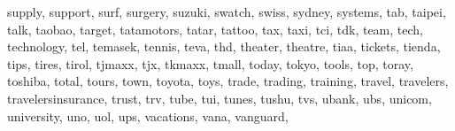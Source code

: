 \documentclass[letterpaper,10pt,english]{sphinxmanual}
\begin{document}
\begin{fulllineitems}
\begin{fulllineitems}
\textquotesingle{}supply\textquotesingle{}, \textquotesingle{}support\textquotesingle{}, \textquotesingle{}surf\textquotesingle{}, \textquotesingle{}surgery\textquotesingle{}, \textquotesingle{}suzuki\textquotesingle{}, \textquotesingle{}swatch\textquotesingle{}, \textquotesingle{}swiss\textquotesingle{}, \textquotesingle{}sydney\textquotesingle{}, \textquotesingle{}systems\textquotesingle{}, \textquotesingle{}tab\textquotesingle{}, \textquotesingle{}taipei\textquotesingle{}, \textquotesingle{}talk\textquotesingle{}, \textquotesingle{}taobao\textquotesingle{}, \textquotesingle{}target\textquotesingle{}, \textquotesingle{}tatamotors\textquotesingle{}, \textquotesingle{}tatar\textquotesingle{}, \textquotesingle{}tattoo\textquotesingle{}, \textquotesingle{}tax\textquotesingle{}, \textquotesingle{}taxi\textquotesingle{}, \textquotesingle{}tci\textquotesingle{}, \textquotesingle{}tdk\textquotesingle{}, \textquotesingle{}team\textquotesingle{}, \textquotesingle{}tech\textquotesingle{}, \textquotesingle{}technology\textquotesingle{}, \textquotesingle{}tel\textquotesingle{}, \textquotesingle{}temasek\textquotesingle{}, \textquotesingle{}tennis\textquotesingle{}, \textquotesingle{}teva\textquotesingle{}, \textquotesingle{}thd\textquotesingle{}, \textquotesingle{}theater\textquotesingle{}, \textquotesingle{}theatre\textquotesingle{}, \textquotesingle{}tiaa\textquotesingle{}, \textquotesingle{}tickets\textquotesingle{}, \textquotesingle{}tienda\textquotesingle{}, \textquotesingle{}tips\textquotesingle{}, \textquotesingle{}tires\textquotesingle{}, \textquotesingle{}tirol\textquotesingle{}, \textquotesingle{}tjmaxx\textquotesingle{}, \textquotesingle{}tjx\textquotesingle{}, \textquotesingle{}tkmaxx\textquotesingle{}, \textquotesingle{}tmall\textquotesingle{}, \textquotesingle{}today\textquotesingle{}, \textquotesingle{}tokyo\textquotesingle{}, \textquotesingle{}tools\textquotesingle{}, \textquotesingle{}top\textquotesingle{}, \textquotesingle{}toray\textquotesingle{}, \textquotesingle{}toshiba\textquotesingle{}, \textquotesingle{}total\textquotesingle{}, \textquotesingle{}tours\textquotesingle{}, \textquotesingle{}town\textquotesingle{}, \textquotesingle{}toyota\textquotesingle{}, \textquotesingle{}toys\textquotesingle{}, \textquotesingle{}trade\textquotesingle{}, \textquotesingle{}trading\textquotesingle{}, \textquotesingle{}training\textquotesingle{}, \textquotesingle{}travel\textquotesingle{}, \textquotesingle{}travelers\textquotesingle{}, \textquotesingle{}travelersinsurance\textquotesingle{}, \textquotesingle{}trust\textquotesingle{}, \textquotesingle{}trv\textquotesingle{}, \textquotesingle{}tube\textquotesingle{}, \textquotesingle{}tui\textquotesingle{}, \textquotesingle{}tunes\textquotesingle{}, \textquotesingle{}tushu\textquotesingle{}, \textquotesingle{}tvs\textquotesingle{}, \textquotesingle{}ubank\textquotesingle{}, \textquotesingle{}ubs\textquotesingle{}, \textquotesingle{}unicom\textquotesingle{}, \textquotesingle{}university\textquotesingle{}, \textquotesingle{}uno\textquotesingle{}, \textquotesingle{}uol\textquotesingle{}, \textquotesingle{}ups\textquotesingle{}, \textquotesingle{}vacations\textquotesingle{}, \textquotesingle{}vana\textquotesingle{}, \textquotesingle{}vanguard\textquotesingle{}, 
\end{fulllineitems}
\end{fulllineitems}
\end{document}
